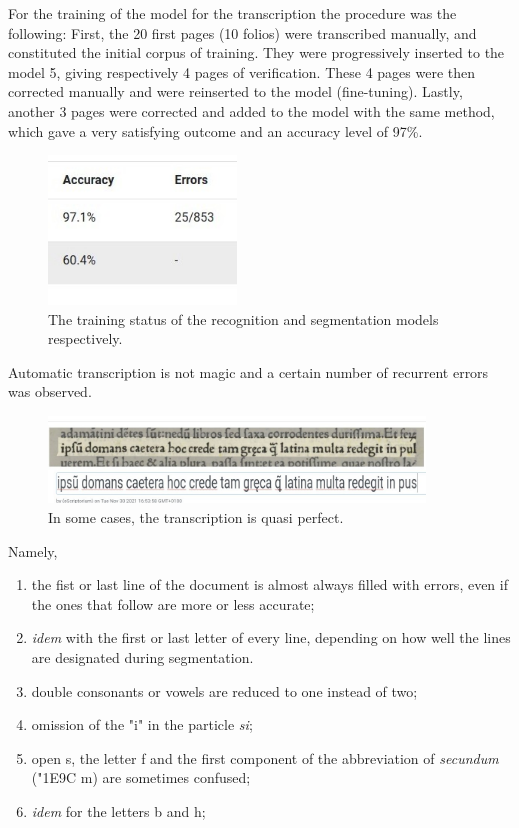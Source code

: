 \documentclass[12pt]{article}
\begin{document}
For the training of the model for the transcription the procedure was the following:
First, the 20 first pages (10 folios) were transcribed manually, and constituted the initial corpus of training. They were progressively inserted to the model 5, giving respectively 4 pages of verification. These 4 pages were then corrected manually and were reinserted to the model (fine-tuning). Lastly, another 3 pages were corrected and added to the model with the same method, which gave a very satisfying outcome and an accuracy level of 97\%.
\begin{figure}[!h]
    \centering
    \includegraphics[width=5cm]{training_status.jpg}
    \caption{The training status of the recognition and segmentation models respectively.}
    \label{fig:ThirdFigure}
\end{figure}

Automatic transcription is not magic and a certain number of recurrent errors was observed.
\begin{figure}[!h]
    \centering
    \includegraphics[width=10cm]{good_transcription.jpg}
    \caption{In some cases, the transcription is quasi perfect.}
    \label{fig:SecFigure}
\end{figure}

Namely, 
\begin{enumerate}
    \item the fist or last line of the document is almost always filled with errors, even if the ones that follow are more or less accurate;
    \item \textit{idem} with the first or last letter of every line, depending on how well the lines are designated during segmentation.
    \item double consonants or vowels are reduced to one instead of two;
    \item omission of the "i" in the particle \textit{si};
    \item open s, the letter f and the first component of the abbreviation of \textit{secundum} (\char"1E9C m) are sometimes confused;
    \item \textit{idem} for the letters b and h;
\end{enumerate}
\end{document}
